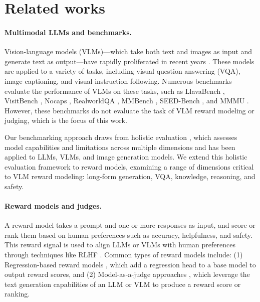 \section{Related works}
\paragraph{Multimodal LLMs and benchmarks.}
Vision-language models (VLMs)---which take both text and images as input and generate text as output---have rapidly proliferated in recent years  \citep{liu2024visual, dai2023instructblip, deitke2024molmo, aria, yasunaga2022retrieval, zhou2024transfusion}. These models are applied to a variety of tasks, including visual question answering (VQA), image captioning, and visual instruction following.  
Numerous benchmarks evaluate the performance of VLMs on these tasks, such as LlavaBench \citep{liu2024visual}, VisitBench \citep{bitton2023visit}, Nocaps \citep{agrawal2019nocaps}, RealworldQA \citep{realworldqa}, MMBench \citep{liu2025mmbench}, SEED-Bench \cite{li2023seed}, and MMMU \citep{yue2023mmmu, yue2024mmmu}. However, these benchmarks do not evaluate the task of VLM reward modeling or judging, which is the focus of this work.  

Our benchmarking approach draws from holistic evaluation \citep{liang2022holistic, lee2024vhelm, lee2024holistic}, which assesses model capabilities and limitations across multiple dimensions and has been applied to LLMs, VLMs, and image generation models. We extend this holistic evaluation framework to reward models, examining a range of dimensions critical to VLM reward modeling: long-form generation, VQA, knowledge, reasoning, and safety.





\paragraph{Reward models and judges.}

A reward model takes a prompt and one or more responses as input, and score or rank them based on human preferences such as accuracy, helpfulness, and safety. This reward signal is used to align LLMs or VLMs with human preferences through techniques like RLHF \citep{instructgpt, bai2022constitutional, llama3}.
Common types of reward models include:
(1) Regression-based reward models \citep{stiennon2020learning, instructgpt}, which add a regression head to a base model to output reward scores, and
(2) Model-as-a-judge approaches \citep{zheng2023judging, lee2024prometheusvision, xiong2024llava, chen2024mllm}, which leverage the text generation capabilities of an LLM or VLM to produce a reward score or ranking.

